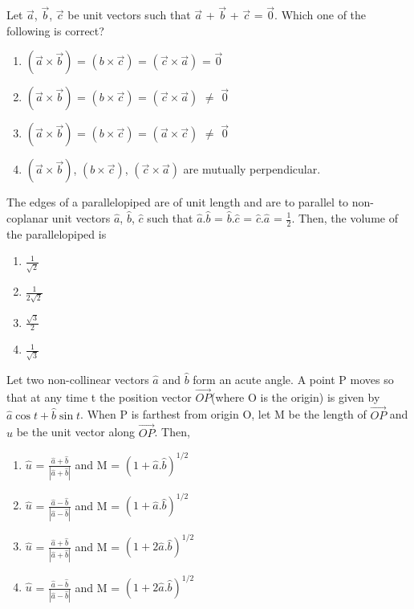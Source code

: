 \item Let $\overrightarrow{a}$, $\overrightarrow{b}$, $\overrightarrow{c}$ be unit vectors such that 
$\overrightarrow{a}$ + $\overrightarrow{b}$ + $\overrightarrow{c}$ = $\overrightarrow{0}$. Which one of the following is correct?
\begin{enumerate}
\item $(\overrightarrow{a} \times \overrightarrow{b})$ = $(b \times \overrightarrow{c})$ = $(\overrightarrow{c} \times \overrightarrow{a})$ = $\overrightarrow{0}$
\item $(\overrightarrow{a} \times \overrightarrow{b})$ = $(b \times \overrightarrow{c})$ = $(\overrightarrow{c} \times \overrightarrow{a})$ $\neq$ $\overrightarrow{0}$
\item $(\overrightarrow{a} \times \overrightarrow{b})$ = $(b \times \overrightarrow{c})$ = $(\overrightarrow{a} \times \overrightarrow{c})$ $\neq$ $\overrightarrow{0}$
\item $(\overrightarrow{a} \times \overrightarrow{b})$, $(b \times \overrightarrow{c})$, $(\overrightarrow{c} \times \overrightarrow{a})$ are mutually perpendicular.
\end{enumerate}

\item The edges of a parallelopiped are of unit length and are to parallel to non-coplanar unit vectors $\hat{a}$, $\hat{b}$, $\hat{c}$ such that $\hat{a}$.$\hat{b}$ = $\hat{b}$.$\hat{c}$ = $\hat{c}$.$\hat{a}$ = $\frac{1}{2}$. Then, the volume of the parallelopiped is
\begin{enumerate}
\item $\frac{1}{\sqrt{2}}$
\item $\frac{1}{2\sqrt{2}}$
\item $\frac{\sqrt{3}}{2}$
\item $\frac{1}{\sqrt{3}}$
\end{enumerate}

\item Let two non-collinear vectors $\hat{a}$ and $\hat{b}$ form an acute angle. A point P moves so that at any time t the position vector $\overrightarrow{OP}$(where O is the origin) is given by $\hat{a}\cos t + \hat{b}\sin t$. When P is farthest from origin O, let M be the length of $\overrightarrow{OP}$ and $\hat{u}$ be the unit vector along $\overrightarrow{OP}$. Then,
\begin{enumerate}
\item $\hat{u}$ = $\frac{\hat{a} + \hat{b}}{|\hat{a} + \hat{b}|}$ and M = $(1 + \hat{a}.\hat{b})^{1/2}$
\item $\hat{u}$ = $\frac{\hat{a} - \hat{b}}{|\hat{a} - \hat{b}|}$ and M = $(1 + \hat{a}.\hat{b})^{1/2}$
\item $\hat{u}$ = $\frac{\hat{a} + \hat{b}}{|\hat{a} + \hat{b}|}$ and M = $(1 + 2\hat{a}.\hat{b})^{1/2}$
\item $\hat{u}$ = $\frac{\hat{a} - \hat{b}}{|\hat{a} - \hat{b}|}$ and M = $(1 + 2\hat{a}.\hat{b})^{1/2}$
\end{enumerate}

